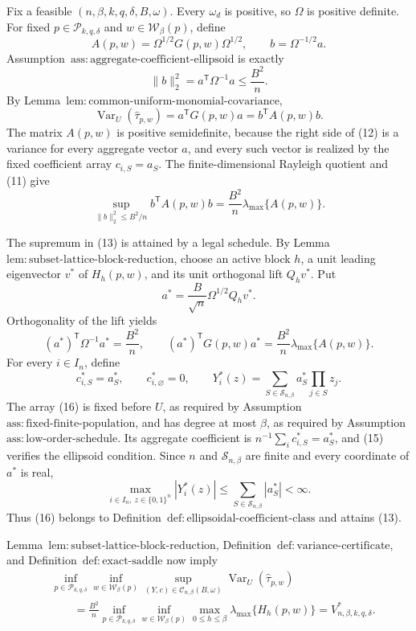 Fix a feasible \((n,\beta,k,q,\delta,B,\omega)\).  Every \(\omega_d\) is positive, so \(\Omega\) is positive definite.  For fixed \(p\in\mathcal P_{k,q,\delta}\) and \(w\in\mathcal W_\beta(p)\), define
\[
A(p,w)=\Omega^{1/2}G(p,w)\Omega^{1/2},
\qquad b=\Omega^{-1/2}a.
\]
Assumption~\(\mathrm{ass{:}aggregate\text{-}coefficient\text{-}ellipsoid}\) is exactly
\[
\|b\|_2^2=a^{\mathsf T}\Omega^{-1}a\le \frac{B^2}{n}.
\tag{11}
\]
By Lemma~\(\mathrm{lem{:}common\text{-}uniform\text{-}monomial\text{-}covariance}\),
\[
\operatorname{Var}_U(\widehat\tau_{p,w})
=a^{\mathsf T}G(p,w)a=b^{\mathsf T}A(p,w)b.
\tag{12}
\]
The matrix \(A(p,w)\) is positive semidefinite, because the right side of (12) is a variance for every aggregate vector \(a\), and every such vector is realized by the fixed coefficient array \(c_{i,S}=a_S\).  The finite-dimensional Rayleigh quotient and (11) give
\[
\sup_{\|b\|_2^2\le B^2/n}b^{\mathsf T}A(p,w)b
=\frac{B^2}{n}\lambda_{\max}\{A(p,w)\}.
\tag{13}
\]

The supremum in (13) is attained by a legal schedule.  By Lemma~\(\mathrm{lem{:}subset\text{-}lattice\text{-}block\text{-}reduction}\), choose an active block \(h\), a unit leading eigenvector \(v^*\) of \(H_h(p,w)\), and its unit orthogonal lift \(Q_hv^*\).  Put
\[
a^*=\frac B{\sqrt n}\Omega^{1/2}Q_hv^*.
\tag{14}
\]
Orthogonality of the lift yields
\[
(a^*)^{\mathsf T}\Omega^{-1}a^*=\frac{B^2}{n},
\qquad
(a^*)^{\mathsf T}G(p,w)a^*
=\frac{B^2}{n}\lambda_{\max}\{A(p,w)\}.
\tag{15}
\]
For every \(i\in I_n\), define
\[
c^*_{i,S}=a^*_S,
\qquad c^*_{i,\varnothing}=0,
\qquad
Y_i^*(z)=\sum_{S\in\mathcal S_{n,\beta}}a^*_S\prod_{j\in S}z_j.
\tag{16}
\]
The array (16) is fixed before \(U\), as required by Assumption~\(\mathrm{ass{:}fixed\text{-}finite\text{-}population}\), and has degree at most \(\beta\), as required by Assumption~\(\mathrm{ass{:}low\text{-}order\text{-}schedule}\).  Its aggregate coefficient is \(n^{-1}\sum_i c^*_{i,S}=a^*_S\), and (15) verifies the ellipsoid condition.  Since \(n\) and \(\mathcal S_{n,\beta}\) are finite and every coordinate of \(a^*\) is real,
\[
\max_{i\in I_n,\ z\in\{0,1\}^n}|Y_i^*(z)|
\le\sum_{S\in\mathcal S_{n,\beta}}|a^*_S|<\infty.
\tag{17}
\]
Thus (16) belongs to Definition~\(\mathrm{def{:}ellipsoidal\text{-}coefficient\text{-}class}\) and attains (13).

Lemma~\(\mathrm{lem{:}subset\text{-}lattice\text{-}block\text{-}reduction}\), Definition~\(\mathrm{def{:}variance\text{-}certificate}\), and Definition~\(\mathrm{def{:}exact\text{-}saddle}\) now imply
\[
\begin{aligned}
&\inf_{p\in\mathcal P_{k,q,\delta}}
  \inf_{w\in\mathcal W_\beta(p)}
  \sup_{(Y,c)\in\mathcal C_{n,\beta}(B,\omega)}
  \operatorname{Var}_U(\widehat\tau_{p,w})\\
&\qquad=\frac{B^2}{n}
\inf_{p\in\mathcal P_{k,q,\delta}}
\inf_{w\in\mathcal W_\beta(p)}
\max_{0\le h\le\beta}\lambda_{\max}\{H_h(p,w)\}
=V^*_{n,\beta,k,q,\delta}.
\end{aligned}
\tag{18}
\]

